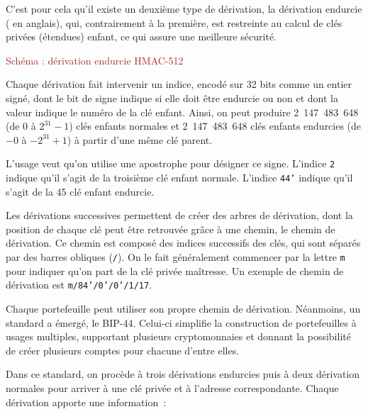 C'est pour cela qu'il existe un deuxième type de dérivation, la dérivation endurcie ( en anglais), qui, contrairement à la première, est restreinte au calcul de clés privées (étendues) enfant, ce qui assure une meilleure sécurité.

\textcolor{brown}{Schéma : dérivation endurcie HMAC-512}

Chaque dérivation fait intervenir un indice, encodé sur 32 bits comme un entier signé, dont le bit de signe indique si elle doit être endurcie ou non et dont la valeur indique le numéro de la clé enfant. Ainsi, on peut produire 2~147~483~648 (de $0$ à $2^{31} - 1$) clés enfants normales et 2~147~483~648 clés enfants endurcies (de $-0$ à $- 2^{31} + 1$) à partir d'une même clé parent.

L'usage veut qu'on utilise une apostrophe pour désigner ce signe. L'indice \texttt{2} indique qu'il s'agit de la troisième clé enfant normale. L'indice \texttt{44'} indique qu'il s'agit de la 45\ieme{} clé enfant endurcie.


Les dérivations successives permettent de créer des arbres de dérivation, dont la position de chaque clé peut être retrouvée grâce à une chemin, le chemin de dérivation. Ce chemin est composé des indices successifs des clés, qui sont séparés par des barres obliques (\texttt{/}). On le fait généralement commencer par la lettre \texttt{m} pour indiquer qu'on part de la clé privée maîtresse. Un exemple de chemin de dérivation est \texttt{m/84'/0'/0'/1/17}.

Chaque portefeuille peut utiliser son propre chemin de dérivation. Néanmoins, un standard a émergé, le BIP-44. Celui-ci simplifie la construction de portefeuilles à usages multiples, supportant plusieurs cryptomonnaies et donnant la possibilité de créer plusieurs comptes pour chacune d'entre elles.

Dans ce standard, on procède à trois dérivations endurcies puis à deux dérivation normales pour arriver à une clé privée et à l'adresse correspondante. Chaque dérivation apporte une information~:

